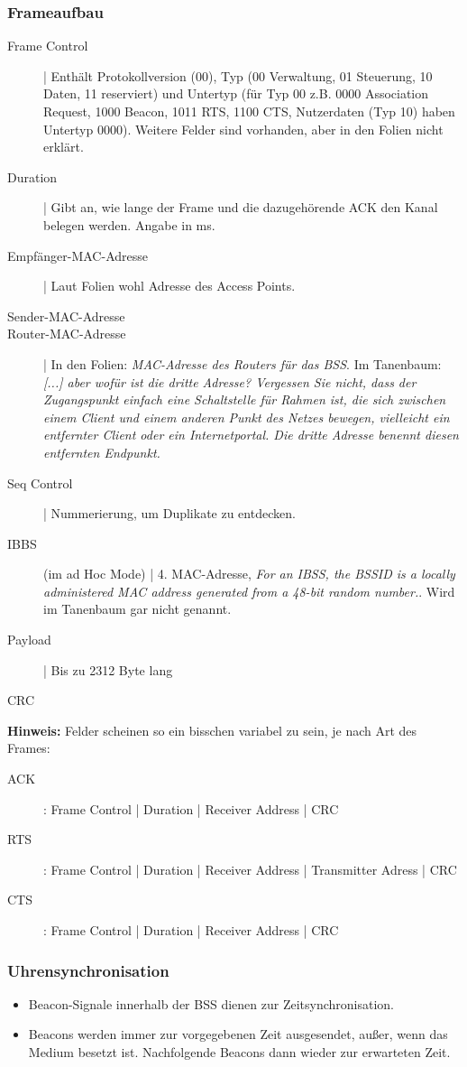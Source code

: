 \documentclass{article} %
\begin{document}
\subsubsection{Frameaufbau}
\begin{description}
	\item[Frame Control] | Enthält Protokollversion (00), Typ (00 Verwaltung, 01 Steuerung, 10 Daten, 11 reserviert) und Untertyp (für Typ 00 z.B. 0000 Association Request, 1000 Beacon, 1011 RTS, 1100 CTS, Nutzerdaten (Typ 10) haben Untertyp 0000).
	Weitere Felder sind vorhanden, aber in den Folien nicht erklärt.
	\item[Duration] | Gibt an, wie lange der Frame und die dazugehörende ACK den Kanal belegen werden.
	Angabe in ms.
	\item[Empfänger-MAC-Adresse] | Laut Folien wohl Adresse des Access Points.
	\item[Sender-MAC-Adresse] 
	\item[Router-MAC-Adresse] | In den Folien: \emph{MAC-Adresse des Routers für das BSS}.
	Im Tanenbaum: \emph{[...] aber wofür ist die dritte Adresse? Vergessen Sie nicht, dass der Zugangspunkt einfach eine Schaltstelle für Rahmen ist, die sich zwischen einem Client und einem anderen Punkt des Netzes bewegen, vielleicht ein entfernter Client oder ein Internetportal. Die dritte Adresse benennt diesen entfernten Endpunkt.}
	\item[Seq Control] | Nummerierung, um Duplikate zu entdecken.
	\item[IBBS] (im ad Hoc Mode) | 4. MAC-Adresse, \emph{For an IBSS, the BSSID is a locally administered MAC address generated from a 48-bit random number.}\cite{wiki:Serviceset}.
	Wird im Tanenbaum gar nicht genannt.
	\item[Payload] | Bis zu 2312 Byte lang
	\item[CRC] 
\end{description}
\textbf{Hinweis:} Felder scheinen so ein bisschen variabel zu sein, je nach Art des Frames:
\begin{description}
	\item[ACK]: Frame Control | Duration | Receiver Address | CRC
	\item[RTS]: Frame Control | Duration | Receiver Address | Transmitter Adress | CRC
	\item[CTS]: Frame Control | Duration | Receiver Address | CRC
\end{description}
\subsubsection{Uhrensynchronisation}
\begin{itemize}
	\item Beacon-Signale innerhalb der BSS dienen zur Zeitsynchronisation.
	\item Beacons werden immer zur vorgegebenen Zeit ausgesendet, außer, wenn das Medium besetzt ist.
	Nachfolgende Beacons dann wieder zur erwarteten Zeit.
\end{itemize}
\end{document}

